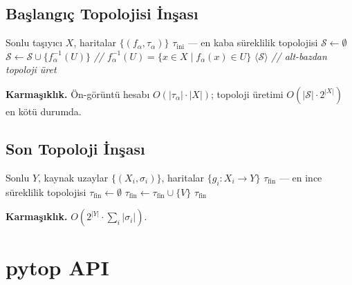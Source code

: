 \subsection{Başlangıç Topolojisi İnşası}

\begin{algorithm}
\caption{Başlangıç Topolojisi (Sonlu Durum)}
\label{alg:initial_topology}
\begin{algorithmic}[1]
\Require Sonlu taşıyıcı $X$, haritalar $\{(f_\alpha, \tau_\alpha)\}$
\Ensure $\tau_{\mathrm{ini}}$ — en kaba süreklilik topolojisi
\State $\mathcal{S} \leftarrow \emptyset$
    \State $\mathcal{S} \leftarrow \mathcal{S} \cup \{f_\alpha^{-1}(U)\}$
    \State \textit{// $f_\alpha^{-1}(U) = \{x \in X \mid f_\alpha(x) \in U\}$}
  \EndFor
\EndFor
\State \Return $\langle \mathcal{S} \rangle$ \textit{// alt-bazdan topoloji üret}
\end{algorithmic}
\end{algorithm}

\textbf{Karmaşıklık.} Ön-görüntü hesabı $O(|\tau_\alpha| \cdot |X|)$; topoloji üretimi
$O(|\mathcal{S}| \cdot 2^{|X|})$ en kötü durumda.

\subsection{Son Topoloji İnşası}

\begin{algorithm}
\caption{Son Topoloji (Sonlu Durum)}
\label{alg:final_topology}
\begin{algorithmic}[1]
\Require Sonlu $Y$, kaynak uzaylar $\{(X_i, \sigma_i)\}$, haritalar $\{g_i : X_i \to Y\}$
\Ensure $\tau_{\mathrm{fin}}$ — en ince süreklilik topolojisi
\State $\tau_{\mathrm{fin}} \leftarrow \emptyset$
    \State $\tau_{\mathrm{fin}} \leftarrow \tau_{\mathrm{fin}} \cup \{V\}$
  \EndIf
\EndFor
\State \Return $\tau_{\mathrm{fin}}$
\end{algorithmic}
\end{algorithm}

\textbf{Karmaşıklık.} $O(2^{|Y|} \cdot \sum_i |\sigma_i|)$.

\section{pytop API}
\label{sec:initial_api}

